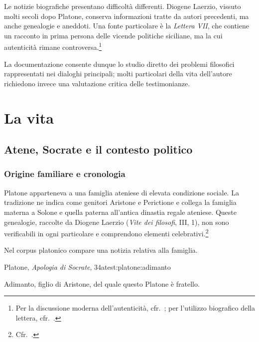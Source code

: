 Le notizie biografiche presentano difficoltà differenti. Diogene Laerzio, vissuto molti secoli dopo Platone, conserva informazioni tratte da autori precedenti, ma anche genealogie e aneddoti. Una fonte particolare è la \emph{Lettera VII}, che contiene un racconto in prima persona delle vicende politiche siciliane, ma la cui autenticità rimane controversa.\footnote{Per la discussione moderna dell'autenticità, cfr.\ \cite{burnyeatfrede2015}; per l'utilizzo biografico della lettera, cfr.\ \cite[94--95]{palumbo2015}.}

La documentazione consente dunque lo studio diretto dei problemi filosofici rappresentati nei dialoghi principali; molti particolari della vita dell'autore richiedono invece una valutazione critica delle testimonianze.

\section{La vita}

\subsection{Atene, Socrate e il contesto politico}

\subsubsection{Origine familiare e cronologia}

Platone apparteneva a una famiglia ateniese di elevata condizione sociale. La tradizione ne indica come genitori Aristone e Perictione e collega la famiglia materna a Solone e quella paterna all'antica dinastia regale ateniese. Queste genealogie, raccolte da Diogene Laerzio (\emph{Vite dei filosofi}, III, 1), non sono verificabili in ogni particolare e comprendono elementi celebrativi.\footnote{Cfr.\ \cite[94]{palumbo2015}.}

Nel corpus platonico compare una notizia relativa alla famiglia.

\begin{testimonianza}{Platone, \emph{Apologia di Socrate}, 34a}{test:platone:adimanto}
\smallskip
{}\par
Adimanto, figlio di Aristone, del quale questo Platone è fratello.
\end{testimonianza}

